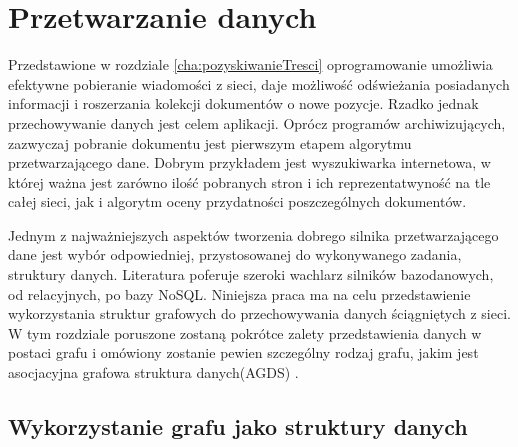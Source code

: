 \chapter{Przetwarzanie danych}
\label{cha:budowaGrafu}

Przedstawione w rozdziale \ref{cha:pozyskiwanieTresci} oprogramowanie umożliwia efektywne pobieranie wiadomości z sieci, daje możliwość odświeżania posiadanych informacji
i roszerzania kolekcji dokumentów o nowe pozycje. Rzadko jednak przechowywanie danych jest celem aplikacji. Oprócz programów archiwizujących, zazwyczaj pobranie dokumentu jest pierwszym
etapem algorytmu przetwarzającego dane. Dobrym przykładem jest wyszukiwarka internetowa, w której ważna jest zarówno ilość pobranych stron i ich reprezentatwyność na tle całej sieci, jak
i algorytm oceny przydatności poszczególnych dokumentów.

Jednym z najważniejszych aspektów tworzenia dobrego silnika przetwarzającego dane jest wybór odpowiedniej, przystosowanej do
wykonywanego zadania, struktury danych. Literatura poferuje szeroki wachlarz silników bazodanowych, od relacyjnych, po bazy NoSQL. Niniejsza praca ma na celu przedstawienie wykorzystania
struktur grafowych do przechowywania danych ściągniętych z sieci. W tym rozdziale poruszone zostaną pokrótce zalety przedstawienia danych w postaci grafu i omówiony zostanie pewien 
szczególny rodzaj grafu, jakim jest asocjacyjna grafowa struktura danych(AGDS) \cite[s. 108]{Horzyk}. 

\section{Wykorzystanie grafu jako struktury danych}
\label{section:graf}

 
